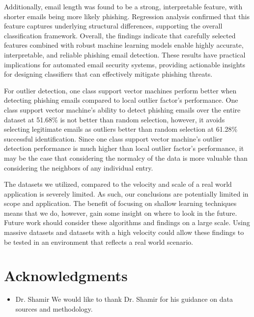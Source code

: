 \documentclass[article,pdftex,10pt,a4paper,twocolumn]{article}
\begin{document}
Additionally, email length was found to be a strong, interpretable feature, with shorter emails being more likely phishing. Regression analysis confirmed that this feature captures underlying structural differences, supporting the overall classification framework.
Overall, the findings indicate that carefully selected features combined with robust machine learning models enable highly accurate, interpretable, and reliable phishing email detection. These results have practical implications for automated email security systems, providing actionable insights for designing classifiers that can effectively mitigate phishing threats.

For outlier detection, one class support vector machines perform better when detecting phishing emails compared to local outlier factor’s performance. One class support vector machine’s ability to detect phishing emails over the entire dataset at 51.68\% is not better than random selection, however, it avoids selecting legitimate emails as outliers better than random selection at 61.28\% successful identification. Since one class support vector machine’s outlier detection performance is much higher than local outlier factor’s performance, it may be the case that considering the normalcy of the data is more valuable than considering the neighbors of any individual entry.

The datasets we utilized, compared to the velocity and scale of a real world application is severely limited. As such, our conclusions are potentially limited in scope and application. The benefit of focusing on shallow learning techniques means that we do, however, gain some insight on where to look in the future. Future work should consider these algorithms and findings on a large scale. Using massive datasets and datasets with a high velocity could allow these findings to be tested in an environment that reflects a real world scenario.

\section*{Acknowledgments}


\begin{itemize}
 \item Dr. Shamir
 \subitem We would like to thank Dr. Shamir for his guidance on data sources and methodology.
\end{itemize}
\end{document}
